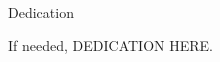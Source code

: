 
\renewcommand{\baselinestretch}{2}
\small\normalsize
\hbox{\ }
 
\vspace{.5in}

\begin{center}
\large{Dedication}
\end{center} 

If needed, DEDICATION HERE.

